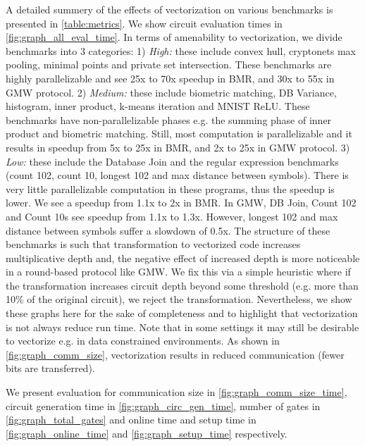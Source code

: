 \begin{figure*}[htbp]
\centering

\caption{Circuit Evaluation Time (Setup + Online) of Benchmarks}
\label{fig:graph_all_eval_time}
\end{figure*}

A detailed summery of the effects of vectorization on various benchmarks is presented in \cref{table:metrics}. We show circuit evaluation times in \cref{fig:graph_all_eval_time}. In terms of amenability to vectorization, we divide benchmarks into 3 categories: 1) {\it High:} these include convex hull, cryptonets max pooling, minimal points and private set intersection. These benchmarks are highly parallelizable and see 25x to 70x speedup in BMR, and 30x to 55x in GMW protocol. 2) {\it Medium:} these include biometric matching, DB Variance, histogram, inner product, k-means iteration and MNIST ReLU. These benchmarks have non-parallelizable phases e.g. the summing phase of inner product and biometric matching. Still, most computation is parallelizable and it results in speedup from 5x to 25x in BMR, and 2x to 25x in GMW protocol. 3) {\it Low:} these include the Database Join and the regular expression benchmarks (count 102, count 10, longest 102 and max distance between symbols). There is very little parallelizable computation in these programs, thus the speedup is lower. We see a speedup from 1.1x to 2x in BMR. In GMW, DB Join, Count 102 and Count 10s see speedup from 1.1x to 1.3x. However, longest 102 and max distance between symbols suffer a slowdown of 0.5x. The structure of these benchmarks is such that transformation to vectorized code increases multiplicative depth and, the negative effect of increased depth is more noticeable in a round-based protocol like GMW. We fix this via a simple heuristic where if the transformation increases circuit depth beyond some threshold (e.g. more than 10\% of the original circuit), we reject the transformation. Nevertheless, we show these graphs here for the sake of completeness and to highlight that vectorization is not always reduce run time. Note that in some settings it may still be desirable to vectorize e.g. in data constrained environments. As shown in \cref{fig:graph_comm_size}, vectorization results in reduced communication (fewer bits are transferred).

We present evaluation for communication size in \cref{fig:graph_comm_size_time}, circuit generation time in \cref{fig:graph_circ_gen_time}, number of gates in \cref{fig:graph_total_gates} and online time and setup time in \cref{fig:graph_online_time} and \cref{fig:graph_setup_time} respectively. 


